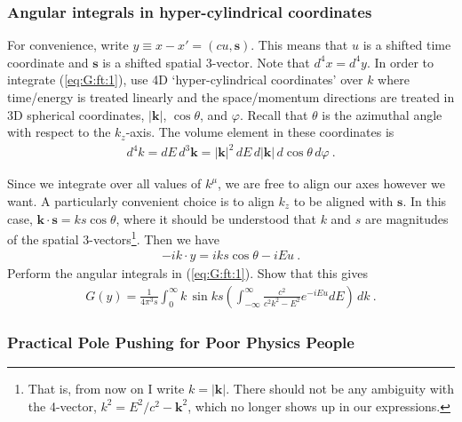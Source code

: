 \documentclass[12pt]{article}
\numberwithin{equation}{subsection}    %
\renewcommand{\vec}[1]{\mathbf{#1}} %
\begin{document}
\subsubsection{Angular integrals in hyper-cylindrical coordinates}

For convenience, write $y \equiv x-x' = (cu,\mathbf{s})$. This means that $u$ is a shifted time coordinate and $\vec s$ is a shifted spatial 3-vector. Note that $d^4x = d^4 y$. In order to integrate (\ref{eq:G:ft:1}), use 4D `hyper-cylindrical coordinates' over $k$ where time/energy is treated linearly and the space/momentum directions are treated in 3D spherical coordinates, $|\vec k|$, $\cos \theta$, and $\varphi$. Recall that $\theta$ is the azimuthal angle with respect to the $k_z$-axis. The volume element in these coordinates is
\begin{align}
	d^4 k = dE \, d^3\vec k = |\vec k|^2 \,dE \,  d|\vec k| \, d\cos \theta \, d\varphi \ .
\end{align}

Since we integrate over all values of $k^\mu$, we are free to align our axes however we want. A particularly convenient choice is to align $k_z$ to be aligned with $\vec s$. In this case, $\vec k \cdot \vec s = ks \cos \theta$, where it should be understood that $k$ and $s$ are magnitudes of the spatial $3$-vectors\footnote{That is, from now on I write $k = |\vec k|$. There should not be any ambiguity with the 4-vector, $k^2 = E^2/c^2 - \vec k^2$, which no longer shows up in our expressions.}.
%
Then we have
\begin{align}
	-ik\cdot y = i k s \cos \theta  - i E u \ .
\end{align}
Perform the angular integrals in (\ref{eq:G:ft:1}).  Show that this gives
\begin{align}
	G(y) = \frac{1}{4\pi^3 s} \int_0^\infty k\,\sin ks 
	\left(
	 \int_{-\infty}^\infty \frac{c^2}{c^2k^2 - E^2} e^{-iE u} dE
	\right) \, dk \ .
	\label{eq:G:cauchy:P:problem}
\end{align}





\subsubsection{Practical Pole Pushing for Poor Physics People}
\end{document}
